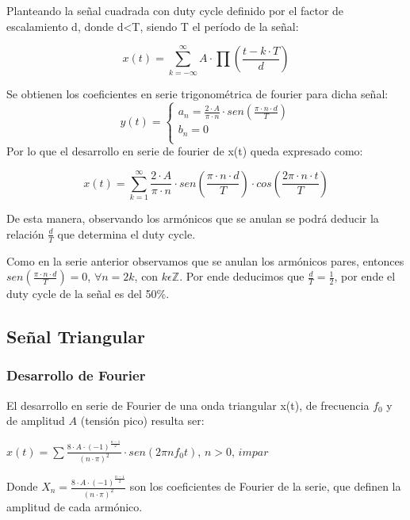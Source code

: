\documentclass[../../labo_tp5_main.tex]{subfiles}
\begin{document}
Planteando la señal cuadrada con duty cycle definido por el factor de escalamiento d, donde d<T, siendo T el período de la señal:\par
\begin{center}
$$x(t) = \sum_{k = -\infty}^{\infty}A\cdot\prod(\frac{t-k\cdot T}{d})$$
\end{center}
Se obtienen los coeficientes en serie trigonométrica de fourier para dicha señal:
	 \begin{equation}
  	   y(t) = \left\{
	  	    \begin{array}{ll}
		 					a_n = \frac{2\cdot A}{\pi\cdot n}\cdot sen(\frac{\pi\cdot n\cdot d}{T}) \\
			 				b_n = 0 \\
	     	 \end{array}
	     	\right.
 	\end{equation}
Por lo que el desarrollo en serie de fourier de x(t) queda expresado como:\par
\begin{center}
$$x(t) = \sum_{k = 1}^{\infty}\frac{2\cdot A}{\pi\cdot n}\cdot sen(\frac{\pi\cdot n\cdot d}{T})\cdot cos(\frac{2\pi\cdot n\cdot t}{T})$$
\end{center}
De esta manera, observando los armónicos que se anulan se podrá deducir la relación $\frac{d}{T}$ que determina el duty cycle.\par
Como en la serie anterior observamos que se anulan los armónicos pares, entonces $sen(\frac{\pi\cdot n\cdot d}{T}) = 0$, $\forall n = 2k$, con $k \epsilon \mathbb{Z}$. Por ende deducimos que $\frac{d}{T} = \frac{1}{2}$, por ende el duty cycle de la señal es del 50\%.

\subsection{Señal Triangular}
\subsubsection{Desarrollo de Fourier}
El desarrollo en serie de Fourier de una onda triangular x(t), de frecuencia $f_0$ y de amplitud $A$ (tensión pico) resulta ser: \par
\begin{center}
$x(t) = \sum\frac{8\cdot A\cdot (-1)^\frac{n-1}{2}}{(n\cdot\pi)^2}\cdot sen(2\pi nf_{0}t),\,n>0,\,impar$
\end{center}
Donde $X_n = \frac{8\cdot A\cdot (-1)^\frac{n-1}{2}}{(n\cdot\pi)^2}$ son los coeficientes de Fourier de la serie, que definen la amplitud de cada armónico.\par
\end{document}
